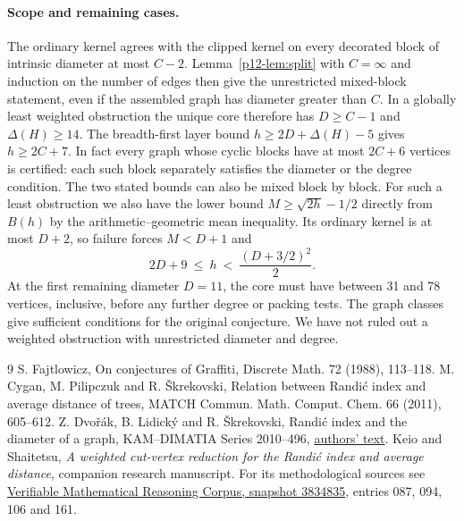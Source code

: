 \documentclass[11pt,a4paper]{article}
\newcommand{\volappendix}{\setcounter{section}{0}\setcounter{subsection}{0}\volumeappendixtrue\renewcommand{\thesection}{\Alph{section}}}
\begin{document}
\paragraph{Scope and remaining cases.}
The ordinary kernel agrees with the clipped kernel on every decorated block of intrinsic diameter at most $C-2$. Lemma~\ref{p12-lem:split} with $C=\infty$ and induction on the number of edges then give the unrestricted mixed-block statement, even if the assembled graph has diameter greater than $C$. In a globally least weighted obstruction the unique core therefore has $D\ge C-1$ and $\Delta(H)\ge14$. The breadth-first layer bound $h\ge2D+\Delta(H)-5$ gives $h\ge 2C+7$. In fact every graph whose cyclic blocks have at most $2C+6$ vertices is certified: each such block separately satisfies the diameter or the degree condition. The two stated bounds can also be mixed block by block. For such a least obstruction we also have the lower bound $M\ge\sqrt{2h}-1/2$ directly from $B(h)$ by the arithmetic--geometric mean inequality. Its ordinary kernel is at most $D+2$, so failure forces $M<D+1$ and
\[
 2D+9\ \le\ h\ <\ \frac{(D+3/2)^2}{2}.
\]
At the first remaining diameter $D=11$, the core must have between 31 and 78 vertices, inclusive, before any further degree or packing tests. The graph classes give sufficient conditions for the original conjecture. We have not ruled out a weighted obstruction with unrestricted diameter and degree.

\begin{thebibliography}{9}
 S. Fajtlowicz, On conjectures of Graffiti, Discrete Math. 72 (1988), 113--118.
 M. Cygan, M. Pilipczuk and R. \v{S}krekovski, Relation between Randi\'c index and average distance of trees, MATCH Commun. Math. Comput. Chem. 66 (2011), 605--612.
 Z. Dvo\v{r}\'ak, B. Lidick\'y and R. \v{S}krekovski, Randi\'c index and the diameter of a graph, KAM--DIMATIA Series 2010--496, \href{https://iti.mff.cuni.cz/series/2010/496.pdf}{authors' text}.
 Keio and Shaitetsu, \emph{A weighted cut-vertex reduction for the Randi\'c index and average distance}, companion research manuscript. For its methodological sources see \href{https://github.com/QEEDDD/Verifiable-Mathematical-Reasoning-Corpus/tree/38348353416f1f7fc50cecb93c3b554a00260c13}{Verifiable Mathematical Reasoning Corpus, snapshot 3834835}, entries 087, 094, 106 and 161.
\end{thebibliography}

\clearpage\volappendix
\end{document}
